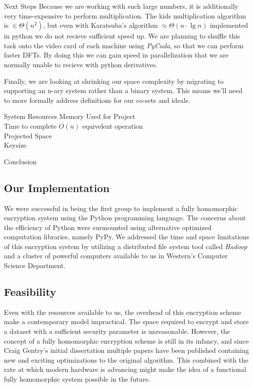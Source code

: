 \documentclass[a0,portrait]{a0poster}
\begin{document}
\begin{multicols}{2}
\begin{slide}{Next Steps}
  Because we are working with such large numbers, it is additionally very time-expensive to perform multiplication. The kids multiplication algorithm is \(\in\Theta(n^2)\), but even with Karatsuba's algorithm \(\approx\Theta(n\cdot\lg n)\) implemented in python we do not recieve sufficient speed up. We are planning to shuffle this task onto the video card of each machine using {\em PyCuda}, so that we can perform faster DFTs. By doing this we can gain speed in parallelization that we are normally unable to recieve with python derivatives.

  Finally, we are looking at shrinking our space complexity by migrating to supporting an n-ary system rather than a binary system. This means we'll need to more formally address definitions for our co-sets and ideals.%
\end{slide}

\begin{slide}{System Resources}
Memory Used for Project \\ Time to complete \(O(n)\) equivelent operation \\ Projected Space \\ Keysize 
\end{slide}

\begin{slide}{Conclusion}

\subsection*{Our Implementation}
\hspace{1em}We were successful in being the first group to implement a fully homomorphic encryption system using the Python programming language. The concerns about the efficiency of Python were surmounted using alternative optimized computation libraries, namely PyPy. We addressed the time and space limitations of this encryption system by utilizing a distributed file system tool called {\em Hadoop} and a cluster of powerful computers available to us in Western's Computer Science Department. 

\subsection*{Feasibility} 
\hspace{1em}Even with the resources available to us, the overhead of this encryption scheme make a contemporary model impractical. The space required to encrypt and store a dataset with a sufficient security parameter is unreasonable. However, the concept of a fully homomorphic encryption scheme is still in its infancy, and since Craig Gentry's initial dissertation multiple papers have been published containing new and exciting optimizations to the original algorithm. This combined with the rate at which modern hardware is advancing might make the idea of a functional fully homomorphic system possible in the future. 


\end{slide}
\end{multicols}
\end{document}
